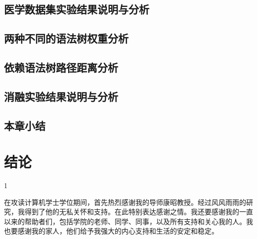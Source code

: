 \documentclass[bachelor]{thesis-uestc}
\begin{document}
\section{医学数据集实验结果说明与分析}\label{sec:medical}

\section{两种不同的语法树权重分析}\label{sec:weight}

\section{依赖语法树路径距离分析}\label{sec:distance}

\section{消融实验结果说明与分析}\label{sec:inter}

\section{本章小结}\label{sec:conclusion}
\newpage
\chapter{结论}
1

\thesisacknowledgement
在攻读计算机学士学位期间，首先热烈感谢我的导师康昭教授。经过风风雨雨的研究，我得到了他的无私关怀和支持。在此特别表达感谢之情。我还要感谢我的一直以来的帮助者们，包括学院的老师、同学、同事，以及所有支持和关心我的人。我也要感谢我的家人，他们给予我强大的内心支持和生活的安定和稳定。

%

%
%






\end{document}
